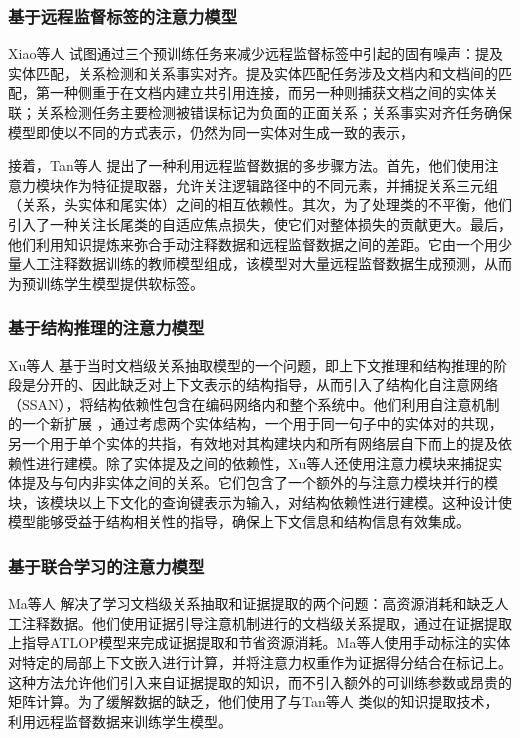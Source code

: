 \documentclass[bachelor]{thesis-uestc}
\begin{document}
\subsubsection{基于远程监督标签的注意力模型}

Xiao等人 试图通过三个预训练任务来减少远程监督标签中引起的固有噪声：提及实体匹配，关系检测和关系事实对齐。提及实体匹配任务涉及文档内和文档间的匹配，第一种侧重于在文档内建立共引用连接，而另一种则捕获文档之间的实体关联；关系检测任务主要检测被错误标记为负面的正面关系；关系事实对齐任务确保模型即使以不同的方式表示，仍然为同一实体对生成一致的表示， \par

接着，Tan等人 提出了一种利用远程监督数据的多步骤方法。首先，他们使用注意力模块作为特征提取器，允许关注逻辑路径中的不同元素，并捕捉关系三元组（关系，头实体和尾实体）之间的相互依赖性。其次，为了处理类的不平衡，他们引入了一种关注长尾类的自适应焦点损失，使它们对整体损失的贡献更大。最后，他们利用知识提炼来弥合手动注释数据和远程监督数据之间的差距。它由一个用少量人工注释数据训练的教师模型组成，该模型对大量远程监督数据生成预测，从而为预训练学生模型提供软标签。

\subsubsection{基于结构推理的注意力模型}

Xu等人 基于当时文档级关系抽取模型的一个问题，即上下文推理和结构推理的阶段是分开的、因此缺乏对上下文表示的结构指导，从而引入了结构化自注意网络（SSAN），将结构依赖性包含在编码网络内和整个系统中。他们利用自注意机制的一个新扩展 \cite{Vaswani2017AttentionIA}，通过考虑两个实体结构，一个用于同一句子中的实体对的共现，另一个用于单个实体的共指，有效地对其构建块内和所有网络层自下而上的提及依赖性进行建模。除了实体提及之间的依赖性，Xu等人还使用注意力模块来捕捉实体提及与句内非实体之间的关系。它们包含了一个额外的与注意力模块并行的模块，该模块以上下文化的查询键表示为输入，对结构依赖性进行建模。这种设计使模型能够受益于结构相关性的指导，确保上下文信息和结构信息有效集成。

\subsubsection{基于联合学习的注意力模型}
Ma等人 解决了学习文档级关系抽取和证据提取的两个问题：高资源消耗和缺乏人工注释数据。他们使用证据引导注意机制进行的文档级关系提取，通过在证据提取上指导ATLOP模型来完成证据提取和节省资源消耗。Ma等人使用手动标注的实体对特定的局部上下文嵌入进行计算，并将注意力权重作为证据得分结合在标记上。这种方法允许他们引入来自证据提取的知识，而不引入额外的可训练参数或昂贵的矩阵计算。为了缓解数据的缺乏，他们使用了与Tan等人 类似的知识提取技术， 利用远程监督数据来训练学生模型。
\end{document}
